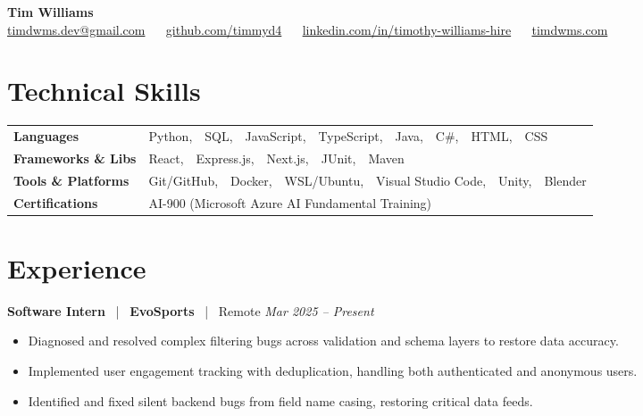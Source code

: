 \documentclass[10pt, letterpaper]{article}
\newcommand{\jobhead}[4]{%
  \vspace{5pt}%
  {\bfseries\color{dark}#1}%
  ~{\color{light}|}~%
  {\bfseries\color{navy}#2}%
  ~{\color{light}|}~%
  {\color{light}#3}%
  \hfill{\color{light}\small\textit{#4}}\\[-2pt]%
}
\newcommand{\skillrow}[2]{%
  {\bfseries #1} & #2 \\[2pt]%
}
\begin{document}

\begin{center}
  {\huge\bfseries\color{navy} Tim Williams}\\[4pt]
  {\small\color{light}
    \href{mailto:timdwms.dev@gmail.com}{timdwms.dev@gmail.com}
    ~\textbullet~
    \href{https://github.com/timmyd4}{github.com/timmyd4}
    ~\textbullet~
    \href{https://www.linkedin.com/in/timothy-williams-hire}{linkedin.com/in/timothy-williams-hire}
    ~\textbullet~
    \href{https://timdwms.com}{timdwms.com}
  }
\end{center}

\vspace{2pt}

\section{Technical Skills}

\begin{tabular}{@{}p{1.6in} p{5.2in}@{}}
  \skillrow{Languages}{Python,\ \ SQL,\ \ JavaScript,\ \ TypeScript,\ \ Java,\ \ C\#,\ \ HTML,\ \ CSS}
  \skillrow{Frameworks \& Libs}{React,\ \ Express.js,\ \ Next.js,\ \ JUnit,\ \ Maven}
  \skillrow{Tools \& Platforms}{Git/GitHub,\ \ Docker,\ \ WSL/Ubuntu,\ \ Visual Studio Code,\ \ Unity,\ \ Blender}
  \skillrow{Certifications}{AI-900 (Microsoft Azure AI Fundamental Training)}
\end{tabular}

\section{Experience}

\jobhead{Software Intern}{EvoSports}{Remote}{Mar 2025 – Present}
\begin{itemize}
  \item Diagnosed and resolved complex filtering bugs across validation and schema layers to restore data accuracy.
  \item Implemented user engagement tracking with deduplication, handling both authenticated and anonymous users.
  \item Identified and fixed silent backend bugs from field name casing, restoring critical data feeds.
\end{itemize}
\end{document}
